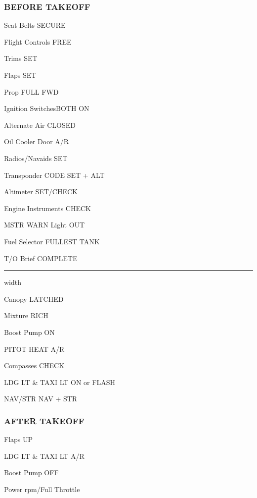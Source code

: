\begin{multicols}{2}
\subsubsection*{BEFORE TAKEOFF}
\begin{enumerate*}
\item Seat Belts \dotfill SECURE
\item Flight Controls \dotfill FREE
\item Trims \dotfill SET
\item Flaps \dotfill SET
\item Prop \dotfill FULL FWD
\item Ignition Switches\dotfill BOTH ON
\item Alternate Air \dotfill CLOSED
\item Oil Cooler Door \dotfill A/R
\item Radios/Navaids \dotfill SET
\item Transponder \dotfill CODE SET + ALT
\item Altimeter \dotfill SET/CHECK
\item Engine Instruments \dotfill CHECK
\item MSTR WARN Light \dotfill OUT
\item Fuel Selector \dotfill FULLEST TANK
\item T/O Brief \dotfill COMPLETE\vspace{0.5ex}
\hrule width \columnwidth \vspace{1ex}
\item Canopy \dotfill LATCHED
\item Mixture \dotfill RICH
\item Boost Pump \dotfill ON
\item PITOT HEAT \dotfill A/R
\item Compasses \dotfill CHECK
\item LDG LT \& TAXI LT \dotfill ON or FLASH
\item NAV/STR \dotfill NAV + STR
\end{enumerate*}

\subsubsection*{AFTER TAKEOFF}
\begin{enumerate*}
\item Flaps \dotfill UP
\item LDG LT \& TAXI LT \dotfill A/R
\item Boost Pump \dotfill OFF
\item Power  rpm/Full Throttle
\end{enumerate*}


\end{multicols}
